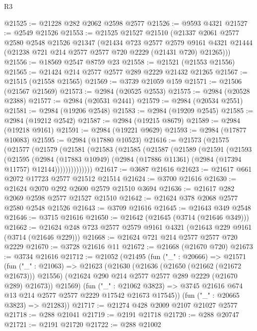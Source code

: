 \begin{lexlean}{R3}
\begin{coremodule}
@21525 := @21228 @282 @2062 @2598 @2577
@21526 := @9593 @4321
@21527 := @2549 @21526
@21553 := @21525
    @21527
    @21510
    (@21337
      @2061
      @2577
      @2580
      @2548
      @21526
      @21347
      (@21434
        @723
        @2577
        @2579
        @9161
        @4321
        @21444
        (@21238 @721 @214 @2577 @2577 @720 @2229 (@21431 @720) @21265)))
@21556 := @18569 @2547 @8759 @23
@21558 := @21521 (@21553 @21556)
@21565 := @21424 @214 @2577 @2577 @289 @2229 @21432 @21265
@21567 := @21515 (@21558 @21565)
@21569 := @3739 @21059 @159
@21571 := @21506 (@21567 @21569)
@21573 := @2984 (@20525 @2553)
@21575 := @2984 (@20528 @2388)
@21577 := @2984 (@20531 @2441)
@21579 := @2984 (@20534 @2551)
@21581 := @2984 (@19206 @2548)
@21583 := @2984 (@19209 @2545)
@21585 := @2984 (@19212 @2542)
@21587 := @2984 (@19215 @8679)
@21589 := @2984 (@19218 @9161)
@21591 := @2984 (@19221 @9629)
@21593 := @2984 (@17877 @10083)
@21595 := @2984 (@17880 @10523)
@21616 := @21573
    (@21575
      (@21577
        (@21579
          (@21581
            (@21583
              (@21585
                (@21587
                  (@21589
                    (@21591
                      (@21593
                        (@21595
                          (@2984
                            (@17883 @10949)
                            (@2984 (@17886 @11361) (@2984 (@17394 @11757) @12144))))))))))))))
@21617 := @3687 @21616
@21623 := @21617 @661 @2072 @17723 @2577 @21512 @21514
@21624 := @3700 @21616
@21630 := @21624 @2070 @292 @2600 @2579 @21510 @3694
@21636 := @21617 @282 @2069 @2598 @2577 @21527 @21510
@21642 := @21624 @378 @2068 @2577 @2580 @2548 @21526
@21643 := @3709 @21616
@21645 := @21643 @349 @2548
@21646 := @3715 @21616
@21650 := @21642 (@21645 (@3714 (@21646 @349)))
@21662 := @21624 @248 @723 @2577 @2579 @9161 @4321 (@21643 @229 @9161 (@3714 (@21646 @229)))
@21668 := @21624 @721 @214 @2577 @2577 @720 @2229
@21670 := @3728 @21616 @11
@21672 := @21668 (@21670 @720)
@21673 := @3734 @21616
@21712 := @21052
    (@21495
      (fun ("_" : @20666) =>
      @21571
        (fun ("_" : @21063) =>
        @21623
          (@21630
            (@21636 (@21650 (@21662 (@21672 @21673))) @21556)
            (@21624 @290 @214 @2577 @2577 @289 @2229 (@21670 @289) @21673))
          @21569)
        (fun ("_" : @21062 @3823) =>
        @3745 @21616 @674 @13 @214 @2577 @2577 @2229 @17542 @21673 @17545))
      (fun ("_" : @20665 @3823) => @21283))
@21717 := @21274 @428 @2009 @2107 @21027 @2577
@21718 := @288 @21041
@21719 := @2191 @21718
@21720 := @288 @20747
@21721 := @2191 @21720
@21722 := @288 @21002

\end{coremodule}
\end{lexlean}
